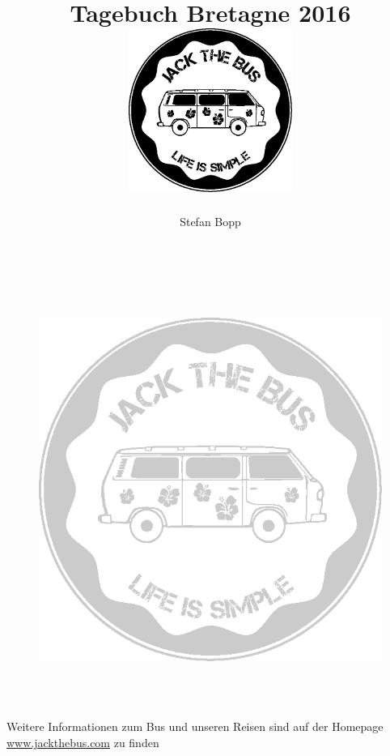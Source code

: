 \documentclass[11pt,nswissgerman]{article}
\begin{document}
\author{Stefan Bopp}
\title{\Huge Tagebuch Bretagne 2016\vspace{2cm}
\includegraphics[width=0.4\textwidth]{../Bilder/Logo/Logo.png}
}
\maketitle
\vfill
\tableofcontents

\newpage



\cfoot{\thepage}

\newpage

\begin{figure}[H]
    \centering
    \includegraphics[width=\textwidth,height=14cm, keepaspectratio]{../Bilder/Logo/Logo_trans.png}
    \label{img:Logo}
\end{figure}
\vfill
    \begin{center}
        {\huge  Weitere Informationen zum Bus und unseren Reisen sind auf der Homepage {\url{www.jackthebus.com}} zu finden}
\end{center}
\end{document}
